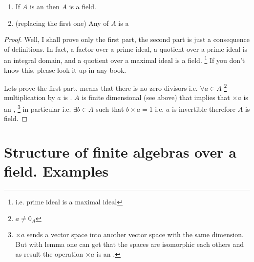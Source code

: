 \begin{proposition}
  \begin{enumerate}
    \item If $A$ is an  then $A$ is a
      field.
    \item (replacing the first one) Any
       of $A$ is a 
  \end{enumerate}
  \begin{proof}
     Well, I shall prove only the first part, the second part is just
     a consequence of definitions. In fact, a factor over a prime
     ideal, a quotient over a prime ideal is an integral domain, and a
     quotient over a maximal ideal is a field.
     \footnote{
       i.e. prime ideal is a maximal ideal 
     }
     If you don't know this,
     please look it up in any book.

     Lets prove the first part.  means
     that there is no zero divisors i.e. $\forall a \in A$
     \footnote{
       $a \ne 0_A$
     }
     multiplication by $a$ is . $A$ is finite
     dimensional  (see above) that implies
     that $\times a$ is an 
     ,
     \footnote{
       $\times a$ sends a vector space  into another vector space with
       the same dimension. But with lemma  one
       can get that the spaces are isomorphic each others and as
       result the operation $\times a$ is an .
     }
     in particular  i.e. $\exists b \in A$
     such that $b \times a = 1$ i.e. $a$ is invertible therefore
     $A$ is field.     
  \end{proof}
  \label{prop:lec4_ideals}
\end{proposition}

\section{Structure of finite algebras over a field. Examples}

